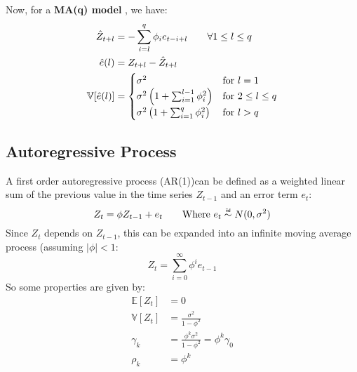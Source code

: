 Now, for a \textbf{MA(q) model} , we have:
\begin{equation*}
    \begin{aligned}
        \hat{Z}_{t+l} &= - \sum_{i=l}^{q} \phi_i e_{t-i+l} \qquad \forall 1 
        \le l \le q \\
        \hat{e}(l) &= Z_{t+l} - \hat{Z}_{t+l} \\
            \mathbb{V}[ \hat{e}(l)] &= \begin{cases}
            \sigma^2 & \text{for $l=1$}\\
            \sigma^2 \left( 1 + \sum_{i=1}^{l-1} \phi_i^2 \right)& \text{for $
            2 \le l \le q$}\\
            \sigma^2 \left( 1 + \sum_{i=1}^{q} \phi_i^2 \right)& \text{for $l >
            q$}\\
        \end{cases}
    \end{aligned}
\end{equation*}


\subsection{Autoregressive Process}
A first order autoregressive process (AR(1))can be defined as a weighted linear
sum of the previous value in the time series $Z_{t-1}$ and an error term
$e_{t}$:
\begin{equation*}
    Z_t = \phi Z_{t - 1} + e_{t} \qquad \text{Where $e_t \iid N(0, \sigma^2)$}
\end{equation*}
Since $Z_{t}$ depends on $Z_{t-1}$, this can be expanded into an infinite
moving average process (assuming $|\phi| < 1$:
\begin{equation*}
    Z_{t} = \sum_{i=0}^{\infty} \phi^{i} e_{t-1}
\end{equation*}
So some properties are given by:
\begin{equation*}
    \begin{aligned}
        \mathbb{E}[Z_{t}] &= 0 \\
        \mathbb{V}[Z_{t}] &= \frac{\sigma^{2}}{1 - \phi^{2}}\\
        \gamma_{k} &= \frac{\phi^{k}\sigma^{2}}{1-\phi^{2}} = \phi^{k}
        \gamma_0  \\
        \rho_{k} &= \phi^{k} \\
    \end{aligned}
\end{equation*}

